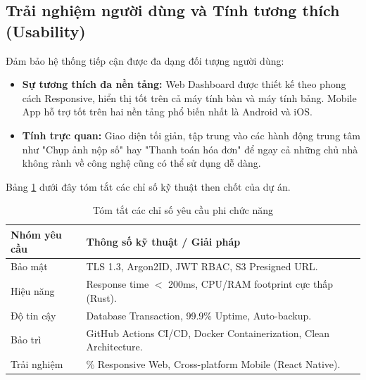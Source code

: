 \subsection{Trải nghiệm người dùng và Tính tương thích (Usability)}
Đảm bảo hệ thống tiếp cận được đa dạng đối tượng người dùng:
\begin{itemize}
    \item \textbf{Sự tương thích đa nền tảng:} Web Dashboard được thiết kế theo phong cách Responsive, hiển thị tốt trên cả máy tính bàn và máy tính bảng. Mobile App hỗ trợ tốt trên hai nền tảng phổ biến nhất là Android và iOS.
    \item \textbf{Tính trực quan:} Giao diện tối giản, tập trung vào các hành động trung tâm như "Chụp ảnh nộp số" hay "Thanh toán hóa đơn" để ngay cả những chủ nhà không rành về công nghệ cũng có thể sử dụng dễ dàng.
\end{itemize}

Bảng \ref{tab:nfr_summary} dưới đây tóm tắt các chỉ số kỹ thuật then chốt của dự án.

\begin{table}[htbp]
\centering
\caption{Tóm tắt các chỉ số yêu cầu phi chức năng}
\label{tab:nfr_summary}
\begin{tabularx}{\textwidth}{l>{\raggedright\arraybackslash}X}
\toprule
\textbf{Nhóm yêu cầu} & \textbf{Thông số kỹ thuật / Giải pháp} \\
\midrule
Bảo mật & TLS 1.3, Argon2ID, JWT RBAC, S3 Presigned URL. \\[5pt]
Hiệu năng & Response time $<$ 200ms, CPU/RAM footprint cực thấp (Rust). \\[5pt]
Độ tin cậy & Database Transaction, 99.9\% Uptime, Auto-backup. \\[5pt]
Bảo trì & GitHub Actions CI/CD, Docker Containerization, Clean Architecture. \\[5pt]
Trải nghiệm & 100\% Responsive Web, Cross-platform Mobile (React Native). \\
\bottomrule
\end{tabularx}
\end{table}

